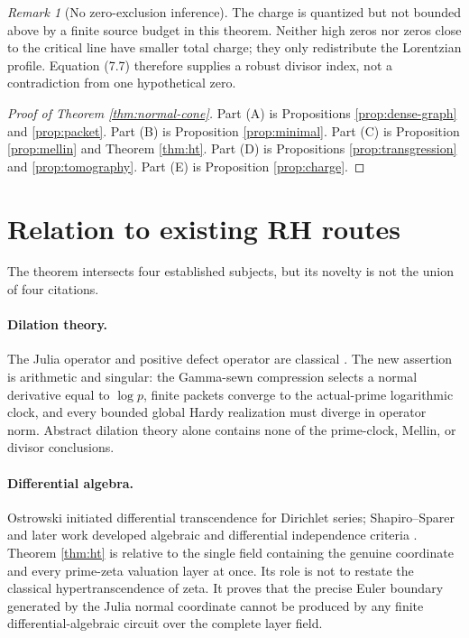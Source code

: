 \documentclass[11pt]{article}
\theoremstyle{definition}
\theoremstyle{remark}
\newtheorem{remark}[theorem]{Remark}
\begin{document}
\begin{remark}[No zero-exclusion inference]
The charge is quantized but not bounded above by a finite source budget in this theorem.
Neither high zeros nor zeros close to the critical line have smaller total charge; they only
redistribute the Lorentzian profile.  Equation (7.7) therefore supplies a robust divisor index,
not a contradiction from one hypothetical zero.
\end{remark}

\begin{proof}[Proof of Theorem \ref{thm:normal-cone}]
Part (A) is Propositions \ref{prop:dense-graph} and \ref{prop:packet}.  Part (B) is Proposition
\ref{prop:minimal}.  Part (C) is Proposition \ref{prop:mellin} and Theorem \ref{thm:ht}.
Part (D) is Propositions \ref{prop:transgression} and \ref{prop:tomography}.  Part (E) is
Proposition \ref{prop:charge}.
\end{proof}

\section{Relation to existing RH routes}\label{sec:literature}

The theorem intersects four established subjects, but its novelty is not the union of four
citations.

\paragraph{Dilation theory.}
The Julia operator and positive defect operator are classical
\cite{Halmos1950,SzNagyFoias2010}.  The new assertion is arithmetic and singular: the Gamma-sewn
compression selects a normal derivative equal to \(\log p\), finite packets converge to the
actual-prime logarithmic clock, and every bounded global Hardy realization must diverge in
operator norm.  Abstract dilation theory alone contains none of the prime-clock, Mellin, or
divisor conclusions.

\paragraph{Differential algebra.}
Ostrowski initiated differential transcendence for Dirichlet series; Shapiro--Sparer and later
work developed algebraic and differential independence criteria
\cite{Ostrowski1920,ShapiroSparer1986,AmouKatsurada2001,Pong2016,Nagoshi2016}.
Theorem \ref{thm:ht} is relative to the single field containing the genuine coordinate and every
prime-zeta valuation layer at once.  Its role is not to restate the classical
hypertranscendence of zeta.  It proves that the precise Euler boundary generated by the Julia
normal coordinate cannot be produced by any finite differential-algebraic circuit over the
complete layer field.
\end{document}
